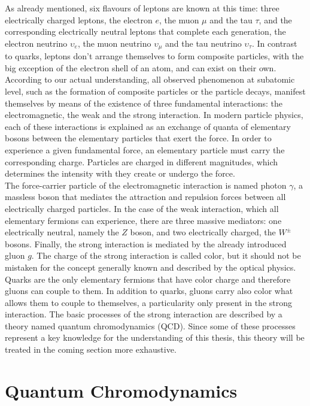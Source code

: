 \documentclass[12pt,a4paper]{report}
\begin{document}
\hspace{-0.53cm} As already mentioned, six flavours of leptons are known at this time: three electrically charged leptons, the electron $e$, the muon $\mu$ and the tau $\tau$, and the corresponding electrically neutral leptons that complete each generation, the electron neutrino $\upsilon_{e}$, the muon neutrino $\upsilon_{\mu}$ and the tau neutrino $\upsilon_{\tau}$. In contrast to quarks, leptons don't arrange themselves to form composite particles, with the big exception of the electron shell of an atom, and can exist on their own. \\
According to our actual understanding, all observed phenomenon at subatomic level, such as the formation of composite particles or the particle decays, manifest themselves by means of the existence of three fundamental interactions: the electromagnetic, the weak and the strong interaction. In modern particle physics, each of these interactions is explained as an exchange of quanta of elementary bosons between the elementary particles that exert the force. In order to experience a given fundamental force, an elementary particle must carry the corresponding charge. Particles are charged in different magnitudes, which determines the intensity with they create or undergo the force. \\
The force-carrier particle of the electromagnetic interaction is named photon $\gamma$, a massless boson that mediates the attraction and repulsion forces between all electrically charged particles. In the case of the weak interaction, which all elementary fermions can experience, there are three massive mediators: one electrically neutral, namely the $Z$ boson, and two electrically charged, the $W^{\pm}$ bosons. Finally, the strong interaction is mediated by the already introduced gluon $g$. The charge of the strong interaction is called color, but it should not be mistaken for the concept generally known and described by the optical physics. Quarks are the only elementary fermions that have color charge and therefore gluons can couple to them. In addition to quarks, gluons carry also color what allows them to couple to themselves, a particularity only present in the strong interaction. The basic processes of the strong interaction are described by a theory named quantum chromodynamics (QCD). Since some of these processes represent a key knowledge for the understanding of this thesis, this theory will be treated in the coming section more exhaustive.

\section{Quantum Chromodynamics}
\end{document}
